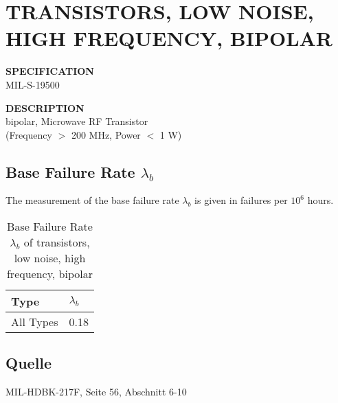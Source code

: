 \section{TRANSISTORS, LOW NOISE, HIGH FREQUENCY, BIPOLAR}

\begin{minipage}[t]{0.29\textwidth}
    \textbf{SPECIFICATION}\\
    MIL-S-19500
\end{minipage}
\begin{minipage}[t]{0.7\textwidth}
    \textbf{DESCRIPTION}\\
    {\fontsize{12pt}{12pt}\selectfont bipolar, Microwave RF Transistor\\(Frequency $>$ 200 MHz, Power $<$ 1 W)}
\end{minipage}

\subsection{Base Failure Rate $\lambda_b$}
The measurement of the base failure rate $\lambda_b$ is given in failures per $10^6$ hours.
\begin{table}[ht]
{\centering

\begin{tabular}{|p{7.5cm}|p{5cm}|}
    \hline
    \textbf{Type} & \textbf{$\lambda_b$} \\
    \hline
    All Types & 0.18 \\
    \hline
\end{tabular}

\caption{Base Failure Rate $\lambda_b$ of transistors, low noise, high frequency, bipolar}

\label{tab:bfr_transistors_low_noise_high_frequency_bipolar}
\par}
\subsection*{Quelle}
MIL-HDBK-217F, Seite 56, Abschnitt 6-10
\end{table}